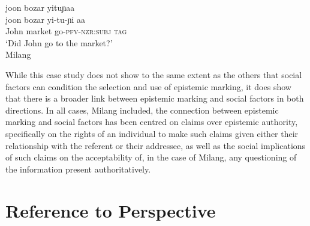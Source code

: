 \begin{exe}
    \ex \label{e:Discussion:MilangInter}
    \glll joon bozar yituɲaa \\
    joon bozar yi-tu-ɲi aa \\
    John market go-\textsc{pfv-nzr:subj} \textsc{tag} \\
    \glt `Did John go to the market?' \\
    Milang \cite[Siangic: India,][457]{Modi2017}
\end{exe}

While this case study does not show to the same extent as the others that social factors can condition the selection and use of epistemic marking, it does show that there is a broader link between epistemic marking and social factors in both directions. In all cases, Milang included, the connection between epistemic marking and social factors has been centred on claims over epistemic authority, specifically on the rights of an individual to make such claims given either their relationship with the referent or their addressee, as well as the social implications of such claims on the acceptability of, in the case of Milang, any questioning of the information present authoritatively.

\section{Reference to Perspective}\label{s:Discussion:Perspective}

